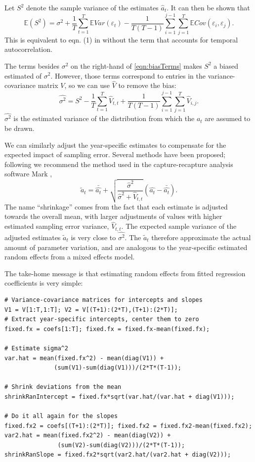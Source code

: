 \documentclass[12pt]{article}
\newcommand{\be}{\begin{equation}}
\newcommand{\ee}{\end{equation}}
\begin{document}
Let $S^2$ denote the sample variance of the estimates $\hat{a}_t$. It can then be shown that 
\be
\mathbb{E}(S^2) = \sigma^2  + \frac{1}{T}\sum\limits_{t=1}^T \mathbb{E} Var(\varepsilon_t) 
- \frac{1}{T(T-1)}\sum\limits_{i=1}^{j-1} \sum\limits_{j=1}^T \mathbb{E}Cov(\varepsilon_i, \varepsilon_j). 
\label{eqn:biasTerms}
\ee
This is equivalent to eqn. (1) in \citet{gould-nichols-1998} without the term that 
accounts for temporal autocorrelation. 

The terms besides $\sigma^2$ on the right-hand of \eqref{eqn:biasTerms} makes $S^2$ a biased estimated of $\sigma^2$. 
However, those terms correspond to entries in the variance-covariance matrix $V$, so we can use $\hat{V}$ to remove 
the bias: 
\be
\hat{\sigma^2}  = S^2 - \frac{1}{T}\sum\limits_{t=1}^T \hat{V}_{t,t} + 
\frac{1}{T(T-1)}\sum\limits_{i=1}^{j-1} \sum\limits_{j=1}^T \hat{V}_{i,j}. 
\label{eqn:hatSigma}
\ee
$\hat{\sigma^2}$ is the estimated variance of the distribution from which the $a_t$ are assumed
to be drawn. 

We can similarly adjust the year-specific estimates to compensate for the expected impact of sampling error. Several methods  
have been proposed; following \citet{metcalf-etal-2015} we recommend the method used in the 
capture-recapture analysis software Mark \citet{cooch-white-2020}, 
\be
\widetilde{a}_t = \bar{\hat{a_t}} + \sqrt{\frac{\hat{\sigma}^2}{\hat{\sigma}^2 + \hat{V}_{t,t}}}\left (\hat{a_t} - \bar{\hat{a_t}} \right). 
\label{eqn:ShrinkLess}
\ee
The name ``shrinkage'' comes from the fact that each estimate is adjusted towards the overall mean, with 
larger adjustments of values with higher estimated sampling error variance, $\hat{V}_{t,t}$. 
The expected sample variance of the adjusted estimates $\widetilde{a}_t$ is very close to $\hat{\sigma^2}$. 
The $\widetilde{a}_t$ therefore approximate the actual amount of parameter variation, and are analogous to the 
year-specific estimated random effects from a mixed effects model. 

The take-home message is that estimating random effects from fitted regression coefficients is very simple: 
\begin{lstlisting}
# Variance-covariance matrices for intercepts and slopes
V1 = V[1:T,1:T]; V2 = V[(T+1):(2*T),(T+1):(2*T)]; 
# Extract year-specific intercepts, center them to zero   
fixed.fx = coefs[1:T]; fixed.fx = fixed.fx-mean(fixed.fx); 

# Estimate sigma^2
var.hat = mean(fixed.fx^2) - mean(diag(V1)) + 
              (sum(V1)-sum(diag(V1)))/(2*T*(T-1)); 

# Shrink deviations from the mean 
shrinkRanIntercept = fixed.fx*sqrt(var.hat/(var.hat + diag(V1)));

# Do it all again for the slopes 
fixed.fx2 = coefs[(T+1):(2*T)]; fixed.fx2 = fixed.fx2-mean(fixed.fx2); 
var2.hat = mean(fixed.fx2^2) - mean(diag(V2)) + 
               (sum(V2)-sum(diag(V2)))/(2*T*(T-1)); 
shrinkRanSlope = fixed.fx2*sqrt(var2.hat/(var2.hat + diag(V2))); 
\end{lstlisting}
\end{document}
